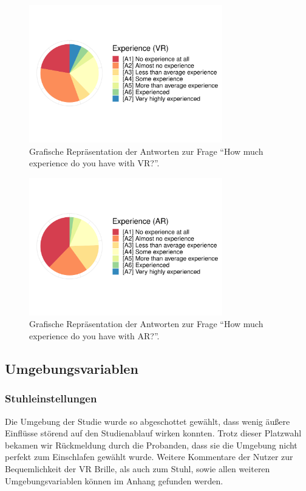 \begin{figure}[H]
	\centering
	\includegraphics[width=0.75\textwidth]{./_StudyResults/expVr}
	\caption{Grafische Repräsentation der Antworten zur Frage "`How much experience do you have with VR?"'.}
	\label{fig:expVr}
\end{figure}%
\begin{figure}[H]
	\centering
	\includegraphics[width=0.75\textwidth]{./_StudyResults/expAr}
	\caption{Grafische Repräsentation der Antworten zur Frage "`How much experience do you have with AR?"'.}
	\label{fig:expAr}
\end{figure}

\subsection{Umgebungsvariablen}
\subsubsection{Stuhleinstellungen}

Die Umgebung der Studie wurde so abgeschottet gewählt, dass wenig äußere Einflüsse störend auf den Studienablauf wirken konnten. Trotz dieser Platzwahl bekamen wir Rückmeldung durch die Probanden, dass sie die Umgebung nicht perfekt zum Einschlafen gewählt wurde. Weitere Kommentare der Nutzer zur Bequemlichkeit der VR Brille, als auch zum Stuhl, sowie allen weiteren Umgebungsvariablen können im Anhang gefunden werden.

